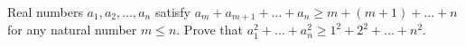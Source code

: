 \problem
Real numbers $a_1, a_2, \ldots, a_n$ satisfy
$a_m + a_{m + 1} + \ldots + a_n \geq m + (m + 1) + \ldots + n$
for any natural number $m \leq n$.
Prove that $a_1^2 + \ldots + a_n^2 \geq 1^2 + 2^2 + \ldots + n^2$.
\solution
\endproblem
